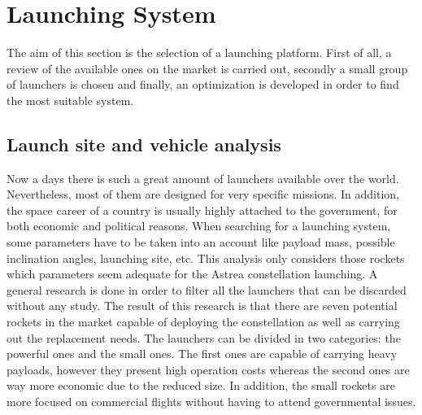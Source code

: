 
%

\section{Launching System}
The aim of this section is the selection of a launching platform. First of all, a review of the available ones on the market is carried out, secondly a small group of launchers is chosen and finally, an optimization is developed in order to find the most suitable system. 
	\subsection{Launch site and vehicle analysis}
Now a days there is such a great amount of launchers available over the world. Nevertheless, most of them are designed for very specific missions. In addition, the space career of a country is usually highly attached to the government, for both economic and political reasons. When searching for a launching system, some parameters have to be taken into an account like payload mass, possible inclination angles, launching site, etc. This analysis only considers those rockets which parameters seem adequate for the Astrea constellation launching.  
\newline
\newline
A general research is done in order to filter all the launchers that can be discarded without any study. The result of this research is that there are seven potential rockets in the market capable of deploying the constellation as well as carrying out the replacement needs. The launchers can be divided in two categories: the powerful ones and the small ones. The first ones are capable of carrying heavy payloads, however they present high operation costs whereas the second ones are way more economic due to the reduced size. In addition, the small rockets are more focused on commercial flights without having to attend governmental issues. 

